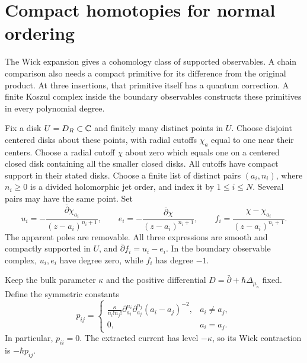\section{Compact homotopies for normal ordering}
\label{sec:bf-compact-current-homotopies}

The Wick expansion gives a cohomology class of supported observables.
A chain comparison also needs a compact primitive for its difference
from the original product.  At three insertions, that primitive itself
has a quantum correction.  A finite Koszul complex inside the boundary
observables constructs these primitives in every polynomial degree.

Fix a disk $U=D_R\subset\mathbb C$ and finitely many distinct points in $U$.
Choose disjoint centered disks about these points, with radial cutoffs
$\chi_a$ equal to one near their centers.  Choose a radial cutoff
$\chi$ about zero which equals one on a centered closed disk containing
all the smaller closed disks.
All cutoffs have compact support in their stated disks.
Choose a finite list of distinct pairs $(a_i,n_i)$, where $n_i\ge0$
is a divided holomorphic jet order, and index it by $1\le i\le N$.
Several pairs may have the same point.  Set
\[
 u_i=-\frac{\bar\partial\chi_{a_i}}{(z-a_i)^{n_i+1}},\qquad
 e_i=-\frac{\bar\partial\chi}{(z-a_i)^{n_i+1}},\qquad
 f_i=\frac{\chi-\chi_{a_i}}{(z-a_i)^{n_i+1}}.
\]
The apparent poles are removable.  All three expressions are smooth
and compactly supported in $U$, and
$\bar\partial f_i=u_i-e_i$.
In the boundary observable complex, $u_i,e_i$ have degree zero,
while $f_i$ has degree $-1$.

Keep the bulk parameter $\kappa$ and the positive differential
$D=\bar\partial+\hbar\Delta_{\mu_\kappa}$ fixed.
Define the symmetric constants
\[
 p_{ij}=
 \begin{cases}
 \displaystyle\frac{\kappa}{n_i!n_j!}
 \partial_{a_i}^{n_i}\partial_{a_j}^{n_j}(a_i-a_j)^{-2},
       &a_i\ne a_j,\\[4pt]
 0,&a_i=a_j.
 \end{cases}
\]
In particular, $p_{ii}=0$.  The extracted current has level
$-\kappa$, so its Wick contraction is $-\hbar p_{ij}$.

